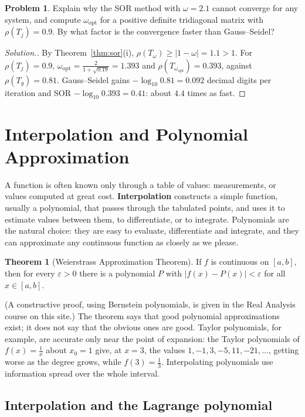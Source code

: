 \documentclass[11pt,a4paper]{article}
\numberwithin{equation}{section}
\theoremstyle{definition}
\newtheorem{thm}{Theorem}[subsection]
\newtheorem{problemx}{Problem}[subsection]
\newenvironment{problem}{\begin{problemx}}{\end{problemx}}
\newenvironment{solution}
  {\renewcommand{\qedsymbol}{}\begin{proof}[\textit{Solution}.]}
  {\end{proof}}
\begin{document}
\begin{problem}
Explain why the SOR method with $\omega = 2.1$ cannot converge for any system, and compute $\omega_{\text{opt}}$ for a positive definite
tridiagonal matrix with $\rho(T_j) = 0.9$. By what factor is the convergence faster than Gauss--Seidel?
\end{problem}
\begin{solution}
By Theorem~\ref{thm:sor}(i), $\rho(T_\omega)\geq|1-\omega| = 1.1>1$. For $\rho(T_j) = 0.9$, $\omega_{\text{opt}} = \frac{2}{1+\sqrt{0.19}} = 1.393$ and
$\rho(T_{\omega_{\text{opt}}}) = 0.393$, against $\rho(T_g) = 0.81$. Gauss--Seidel gains $-\log_{10}0.81 = 0.092$ decimal digits per iteration and SOR
$-\log_{10}0.393 = 0.41$: about $4.4$ times as fast.
\end{solution}


\section{Interpolation and Polynomial Approximation}
\label{sec:interp}

A function is often known only through a table of values: measurements, or values computed at great cost. \textbf{Interpolation}
constructs a simple function, usually a polynomial, that passes through the tabulated points, and uses it to estimate values between
them, to differentiate, or to integrate. Polynomials are the natural choice: they are easy to evaluate, differentiate and integrate, and
they can approximate any continuous function as closely as we please.

\begin{thm}[Weierstrass Approximation Theorem]
\label{thm:weierstrass}
If $f$ is continuous on $[a,b]$, then for every $\varepsilon>0$ there is a polynomial $P$ with $|f(x)-P(x)|<\varepsilon$ for all $x\in[a,b]$.
\end{thm}

(A constructive proof, using Bernstein polynomials, is given in the Real Analysis course on this site.) The theorem says that good
polynomial approximations exist; it does not say that the obvious ones are good. Taylor polynomials, for example, are accurate only near
the point of expansion: the Taylor polynomials of $f(x) = \frac1x$ about $x_0 = 1$ give, at $x = 3$, the values $1, -1, 3, -5, 11, -21,\dots$,
getting worse as the degree grows, while $f(3) = \frac13$. Interpolating polynomials use information spread over the whole interval.


\subsection{Interpolation and the Lagrange polynomial}
\label{sec:lagrange}
\end{document}
